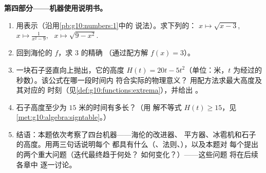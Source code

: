 \begin{problem}
\medskip
\noindent\textbf{第四部分——机器使用说明书。}
\begin{enumerate}[resume]
  \item 用表示（沿用\cref{pb:g10:numbers:1}中的
        说法）。求下列的：
        $x \mapsto \sqrt{x - 3}$, \
        $x \mapsto \frac{1}{x^2 - 9}$, \
        $x \mapsto \sqrt{9 - x^2}$.
  \item 回到海伦的 $f$，求 $3$ 的精确
        （通过配方解 $f(x) = 3$）。
  \item 一块石子竖直向上抛出，它的高度
        $H(t) = 20t - 5t^2$（单位：米，$t$ 为经过的秒数）。该公式在哪一段时间内
        符合实际的物理意义？
        用配方法求最大高度及其对应的
        时刻（见\cref{def:g10:functions:extrema}），并给出
        。
  \item 石子高度至少为 $15$ 米的时间有多长？（用
        解不等式 $H(t) \geq 15$，见
        \cref{met:g10:algebra:signtable}。）
  \item 结语：本题依次考察了四台机器——海伦的改进器、
        平方器、冰雹机和石子的高度。用两三句话说明每个
        都具有什么（、法则、），以及本题对
        每个提出的两个重大问题（迭代最终趋于何处？
        \omterm{def:g10:functions:function}{函数}如何变化？）——这些问题
        将在后续各章中
        逐一讨论。
\end{enumerate}
\end{problem}
